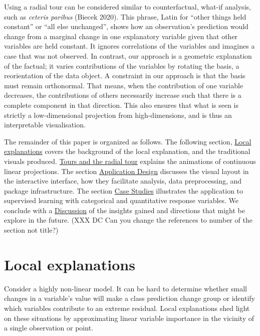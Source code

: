\documentclass[
]{article}
\begin{document}
Using a radial tour can be considered similar to counterfactual, what-if
analysis, such as \emph{ceteris paribus} (Biecek 2020). This phrase,
Latin for ``other things held constant'' or ``all else unchanged'',
shows how an observation's prediction would change from a marginal
change in one explanatory variable given that other variables are held
constant. It ignores correlations of the variables and imagines a case
that was not observed. In contrast, our approach is a geometric
explanation of the factual; it varies contributions of the variables by
rotating the basis, a reorientation of the data object. A constraint in
our approach is that the basis must remain orthonormal. That means, when
the contribution of one variable decreases, the contributions of others
necessarily increase such that there is a complete component in that
direction. This also ensures that what is seen is strictly a
low-dimensional projection from high-dimensions, and is thus an
interpretable visualisation.

The remainder of this paper is organized as follows. The following
section, \protect\hyperlink{sec:explanations}{Local explanations} covers
the background of the local explanation, and the traditional visuals
produced. \protect\hyperlink{sec:tour}{Tours and the radial tour}
explains the animations of continuous linear projections. The section
\protect\hyperlink{sec:applicationdesign}{Application Design} discusses
the visual layout in the interactive interface, how they facilitate
analysis, data preprocessing, and package infrastructure. The section
\protect\hyperlink{sec:casestudies}{Case Studies} illustrates the
application to supervised learning with categorical and quantitative
response variables. We conclude with a
\protect\hyperlink{sec:cheemdiscussion}{Discussion} of the insights
gained and directions that might be explore in the future. (XXX DC Can
you change the references to number of the section not title?)

\hypertarget{sec:explanations}{%
\section{Local explanations}\label{sec:explanations}}

Consider a highly non-linear model. It can be hard to determine whether
small changes in a variable's value will make a class prediction change
group or identify which variables contribute to an extreme residual.
Local explanations shed light on these situations by approximating
linear variable importance in the vicinity of a single observation or
point.
\end{document}
